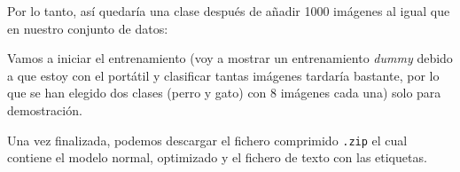 
Por lo tanto, así quedaría una clase después de añadir 1000 imágenes al igual que en nuestro conjunto de datos:


Vamos a iniciar el entrenamiento (voy a mostrar un entrenamiento \textit{dummy} debido a que estoy con el portátil y clasificar tantas imágenes tardaría bastante, por lo que se han elegido dos clases (perro y gato) con 8 imágenes cada una) solo para demostración.


Una vez finalizada, podemos descargar el fichero comprimido \texttt{.zip} el cual contiene el modelo normal, optimizado y el fichero de texto con las etiquetas.







